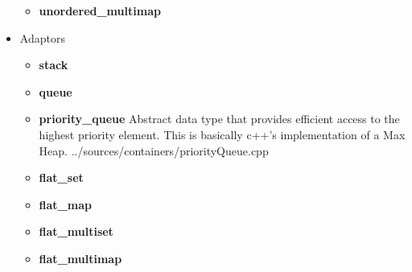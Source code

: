 \documentclass{article}
\begin{document}
\begin{itemize}
\begin{itemize}
		      \item \textbf{unordered\_multimap}
	      \end{itemize}
	\item Adaptors
	      \begin{itemize}
		      \item \textbf{stack}
		      \item \textbf{queue}
		      \item \textbf{priority\_queue} Abstract data type that provides efficient access to the highest priority element. This is basically c++'s implementation of a Max Heap.
		             {../sources/containers/priorityQueue.cpp}
		      \item \textbf{flat\_set}
		      \item \textbf{flat\_map}
		      \item \textbf{flat\_multiset}
		      \item \textbf{flat\_multimap}
	      \end{itemize}
\end{itemize}
\end{document}
